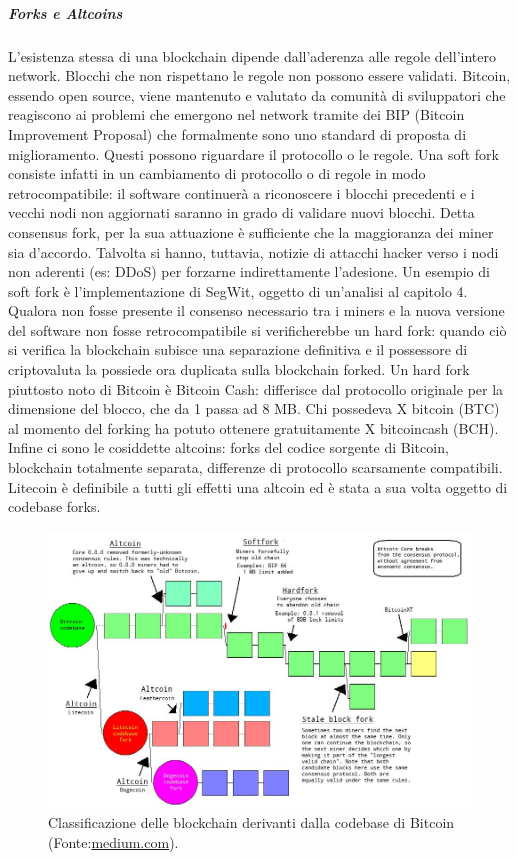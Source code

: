 \subparagraph{Forks e Altcoins}

L’esistenza stessa di una blockchain dipende dall’aderenza alle regole dell’intero network. Blocchi che non rispettano le regole non possono essere validati.
Bitcoin, essendo open source, viene mantenuto e valutato da comunità di sviluppatori che reagiscono ai problemi che emergono nel network tramite dei BIP (Bitcoin Improvement Proposal) che formalmente sono uno standard di proposta di miglioramento. Questi possono riguardare il protocollo o le regole. Una soft fork consiste infatti in un cambiamento di protocollo o di regole in modo retrocompatibile: il software continuerà a riconoscere i blocchi precedenti e i vecchi nodi non aggiornati saranno in grado di validare nuovi blocchi. Detta consensus fork, per la sua attuazione è sufficiente che la maggioranza dei miner sia d’accordo. Talvolta si hanno, tuttavia, notizie di attacchi hacker verso i nodi non aderenti (es: DDoS) per forzarne indirettamente l’adesione. Un esempio di soft fork è l’implementazione di SegWit, oggetto di un’analisi al capitolo 4.
Qualora non fosse presente il consenso necessario tra i miners e la nuova versione del software non fosse retrocompatibile si verificherebbe un hard fork: quando ciò si verifica la blockchain subisce una separazione definitiva e il possessore di criptovaluta la possiede ora duplicata sulla blockchain forked.
Un hard fork piuttosto noto di Bitcoin è Bitcoin Cash: differisce dal protocollo originale per la dimensione del blocco, che da 1 passa ad 8 MB. Chi possedeva X bitcoin (BTC) al momento del forking ha potuto ottenere gratuitamente X bitcoincash (BCH).
Infine ci sono le cosiddette altcoins: forks del codice sorgente di Bitcoin, blockchain totalmente separata, differenze di protocollo scarsamente compatibili. Litecoin è definibile a tutti gli effetti una altcoin ed è stata a sua volta oggetto di codebase forks.


\begin{figure}
	\centering
	\includegraphics[width=1.0\linewidth]{images/altcoinsoftforksetc}
	\caption{Classificazione delle blockchain derivanti dalla codebase di Bitcoin (Fonte:\url{medium.com}).}
	\label{fig:altcoinsoftforksetc}
\end{figure}





